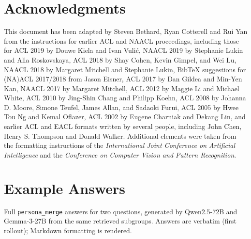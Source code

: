 \documentclass[11pt]{article}
\begin{document}


\section*{Acknowledgments}

This document has been adapted
by Steven Bethard, Ryan Cotterell and Rui Yan
from the instructions for earlier ACL and NAACL proceedings, including those for
ACL 2019 by Douwe Kiela and Ivan Vuli\'{c},
NAACL 2019 by Stephanie Lukin and Alla Roskovskaya,
ACL 2018 by Shay Cohen, Kevin Gimpel, and Wei Lu,
NAACL 2018 by Margaret Mitchell and Stephanie Lukin,
Bib\TeX{} suggestions for (NA)ACL 2017/2018 from Jason Eisner,
ACL 2017 by Dan Gildea and Min-Yen Kan,
NAACL 2017 by Margaret Mitchell,
ACL 2012 by Maggie Li and Michael White,
ACL 2010 by Jing-Shin Chang and Philipp Koehn,
ACL 2008 by Johanna D. Moore, Simone Teufel, James Allan, and Sadaoki Furui,
ACL 2005 by Hwee Tou Ng and Kemal Oflazer,
ACL 2002 by Eugene Charniak and Dekang Lin,
and earlier ACL and EACL formats written by several people, including
John Chen, Henry S. Thompson and Donald Walker.
Additional elements were taken from the formatting instructions of the \emph{International Joint Conference on Artificial Intelligence} and the \emph{Conference on Computer Vision and Pattern Recognition}.

%



\appendix
\section{Example Answers}
\label{app:examples}

Full \texttt{persona\_merge} answers for two questions, generated by Qwen2.5-72B
and Gemma-3-27B from the same retrieved subgroups. Answers are verbatim (first
rollout); Markdown formatting is rendered.
\end{document}
